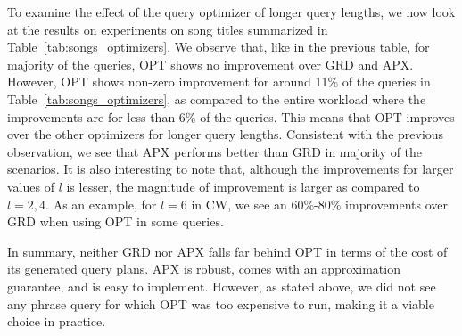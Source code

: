 
To examine the effect of the query optimizer of longer query lengths, we now look at the results on experiments on song titles summarized in Table~\ref{tab:songs_optimizers}. We observe that, like in the previous table, for majority of the queries, OPT shows no improvement over GRD and APX. However, OPT shows non-zero improvement for around 11\% of the queries in Table~\ref{tab:songs_optimizers}, as compared to the entire workload where the improvements are for less than 6\% of the queries. This means that OPT improves over the other optimizers for longer query lengths. Consistent with the previous observation, we see that APX performs better than GRD in majority of the scenarios. It is also interesting to note that, although the improvements for larger values of $l$ is lesser, the magnitude of improvement is larger as compared to $l=2,4$. As an example, for $l=6$ in CW, we see an 60\%-80\% improvements over GRD when using OPT in some queries.


In summary, neither GRD nor APX falls far behind OPT in terms of the
cost of its generated query plans. APX is robust, comes with an
approximation guarantee, and is easy to implement. However, as stated
above, we did not see any phrase query for which OPT was too expensive
to run, making it a viable choice in practice.

